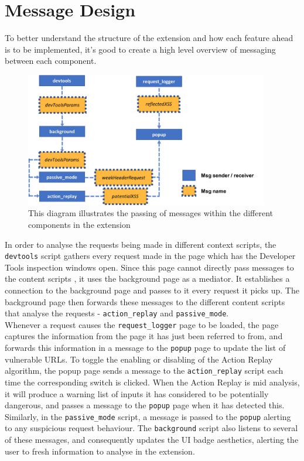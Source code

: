 \section{Message Design}

To better understand the structure of the extension and how each feature ahead is to be implemented, it's good to create a high level overview of messaging between each component.  \\

\begin{figure}[h]
	\centering
	\includegraphics[width=0.95\textwidth]{images/message_passing.png}
	\caption{This diagram illustrates the passing of messages within the different components in the extension}
	\label{fig:test}
\end{figure}

In order to analyse the requests being made in different context scripts, the \texttt{devtools} script gathers every request made in the page which has the Developer Tools inspection windows open. Since this page cannot directly pass messages to the content scripts \cite{chromeExtensionDevTools}, it uses the background page as a mediator. It establishes a connection to the background page and passes to it every request it picks up. The background page then forwards these messages to the different content scripts that analyse the requests - \texttt{action\_replay} and \texttt{passive\_mode}. \\

Whenever a request causes the \texttt{request\_logger} page to be loaded, the page captures the information from the page it has just been referred to from, and forwards this information in a message to the \texttt{popup} page to update the list of vulnerable URLs. To toggle the enabling or disabling of the Action Replay algorithm, the popup page sends a message to the \texttt{action\_replay} script each time the corresponding switch is clicked. When the Action Replay is mid analysis, it will produce a warning list of inputs it has considered to be potentially dangerous, and passes a message to the \texttt{popup} page when it has detected this. Similarly, in the \texttt{passive\_mode} script, a message is passed to the \texttt{popup} alerting to any suspicious request behaviour. The \texttt{background} script also listens to several of these messages, and consequently updates the UI badge aesthetics, alerting the user to fresh information to analyse in the extension.

